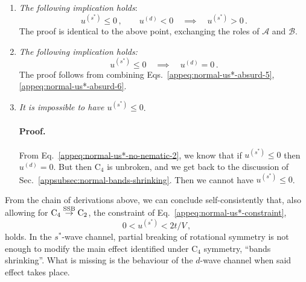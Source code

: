 \begin{tabproof}
\begin{enumerate}
\[	\quad\colon\quad
	\begin{aligned}
		f(\tilde{\epsilon}_\mathbf{k};\beta,\tilde{\mu}) &\ge f(-\tilde{\epsilon}_{\mathcal{R}\mathbf{k}};\beta,\tilde{\mu})\, , \\
		f(-\tilde{\epsilon}_\mathbf{k};\beta,\tilde{\mu}) &\le f(\tilde{\epsilon}_{\mathcal{R}\mathbf{k}};\beta,\tilde{\mu}) \, .
	\end{aligned}
	\]
	This condition, inserted in Eq.~\eqref{appeq:normal-us*-AR}, leads to an absurd:
	\[
		u^{(s^*)} \le 0 \, ,\qquad
		u^{(d)} > 0
		\quad\implies\quad
		u^{(s^*)} > 0 \, .
	\]
	which coincides with Eq.~\eqref{appeq:normal-us*-absurd-5}.
	\item \textit{The following implication holds}:
	\begin{equation}\label{appeq:normal-us*-absurd-6}
		u^{(s^*)} \le 0 \, ,
		\qquad
		u^{(d)} < 0
		\quad\implies\quad
		u^{(s^*)} > 0 \, .
	\end{equation}
	The proof is identical to the above point, exchanging the roles of $\mathcal{A}$ and $\mathcal{B}$.
	\item \textit{The following implication holds:}
	\begin{equation}\label{appeq:normal-us*-no-nematic-2}
		u^{(s^*)} \le 0
		\quad\implies\quad
		u^{(d)} = 0 \, .
	\end{equation}
	The proof follows from combining Eqs.~\eqref{appeq:normal-us*-absurd-5}, \eqref{appeq:normal-us*-absurd-6}.
	\item \textit{It is impossible to have $u^{(s^*)} \le 0$}.
	
	\paragraph{Proof.}
	
	From Eq.~\eqref{appeq:normal-us*-no-nematic-2}, we know that if $u^{(s^*)} \le 0$ then $u^{(d)} = 0$. But then $\mathrm{C}_4$ is unbroken, and we get back to the discussion of Sec.~\ref{appsubsec:normal-bands-shrinking}. Then we cannot have $u^{(s^*)} \le 0$.
	\setcounter{enumTemp}{\theenumi}
\end{enumerate}
From the chain of derivations above, we can conclude self-consistently that, also allowing for $\mathrm{C}_4 \stackrel{\mathrm{SSB}}{\to} \mathrm{C}_2$, the constraint of Eq.~\eqref{appeq:normal-us*-constraint},
\[
	0 < u^{(s^*)} < 2t/V \, ,
\]
holds. In the $s^*$-wave channel, partial breaking of rotational symmetry is not enough to modify the main effect identified under $\mathrm{C}_4$ symmetry, ``bands shrinking''. What is missing is the behaviour of the $d$-wave channel when said effect takes place. 


\end{tabproof}
